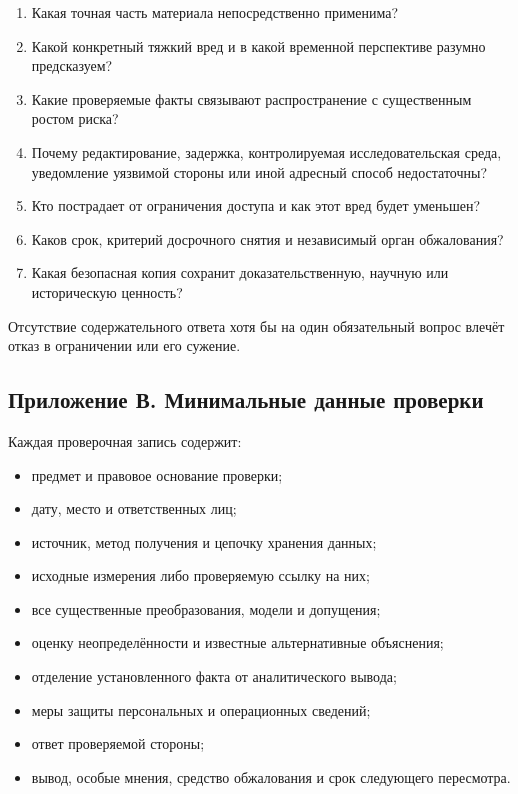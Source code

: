 \documentclass[
  russian,
  11pt,
  a4paper,
]{article}
\providecommand{\tightlist}{%
  \setlength{\itemsep}{0pt}\setlength{\parskip}{0pt}}
\begin{document}
\begin{enumerate}
\def\labelenumi{\arabic{enumi}.}
\tightlist
\item
  Какая точная часть материала непосредственно применима?
\item
  Какой конкретный тяжкий вред и в какой временной перспективе разумно
  предсказуем?
\item
  Какие проверяемые факты связывают распространение с существенным
  ростом риска?
\item
  Почему редактирование, задержка, контролируемая исследовательская
  среда, уведомление уязвимой стороны или иной адресный способ
  недостаточны?
\item
  Кто пострадает от ограничения доступа и как этот вред будет уменьшен?
\item
  Каков срок, критерий досрочного снятия и независимый орган
  обжалования?
\item
  Какая безопасная копия сохранит доказательственную, научную или
  историческую ценность?
\end{enumerate}

Отсутствие содержательного ответа хотя бы на один обязательный вопрос
влечёт отказ в ограничении или его сужение.

\subsection{Приложение В. Минимальные данные
проверки}\label{ux43fux440ux438ux43bux43eux436ux435ux43dux438ux435-ux432-ux43cux438ux43dux438ux43cux430ux43bux44cux43dux44bux435-ux434ux430ux43dux43dux44bux435-ux43fux440ux43eux432ux435ux440ux43aux438}

Каждая проверочная запись содержит:

\begin{itemize}
\tightlist
\item
  предмет и правовое основание проверки;
\item
  дату, место и ответственных лиц;
\item
  источник, метод получения и цепочку хранения данных;
\item
  исходные измерения либо проверяемую ссылку на них;
\item
  все существенные преобразования, модели и допущения;
\item
  оценку неопределённости и известные альтернативные объяснения;
\item
  отделение установленного факта от аналитического вывода;
\item
  меры защиты персональных и операционных сведений;
\item
  ответ проверяемой стороны;
\item
  вывод, особые мнения, средство обжалования и срок следующего
  пересмотра.
\end{itemize}
\end{document}
